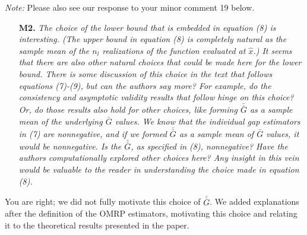\documentclass[11pt,notitlepage,onecolumn]{article}
\newcommand{\noi}{\noindent}
\newcommand{\gb}{\bar{G}}
\newcommand{\gbb}{\bar{\gb}}
\begin{document}
\noi
{\it Note:} Please also see our response to your minor comment 19 below.
\medskip



\begin{itemize}
\item[\textbf{M2.}] \textit{The choice of the lower bound that is embedded in equation (8) is interesting. 
(The upper bound in equation (8) is completely natural as the sample mean of the $n_l$ realizations of the function evaluated at $\hat{x}$.) 
It seems that there are also other natural choices that could be made here for the lower bound. 
There is some discussion of this choice in the text that follows equations (7)-(9), but can the authors say more? For example, do the consistency and asymptotic validity results that follow hinge on this choice? Or, do those results also hold for other choices, like forming $\gbb$ as a sample
mean of the underlying $\gb$ values. 
We know that the individual gap estimators in (7) are nonnegative, and if we formed $\gbb$ as a sample mean of $\gb$ values, it would be nonnegative. 
Is the $\gbb$, as specified in (8), nonnegative? 
Have the authors computationally explored other choices here? 
Any insight in this vein would be valuable to the reader in understanding the choice made in equation (8).}
\end{itemize}

\noi
You are right; we did not fully motivate this choice of $\gbb$.  
We added explanations after the definition of the OMRP estimators, motivating this choice and relating it to the theoretical results presented in the paper.\smallskip 
\end{document}
